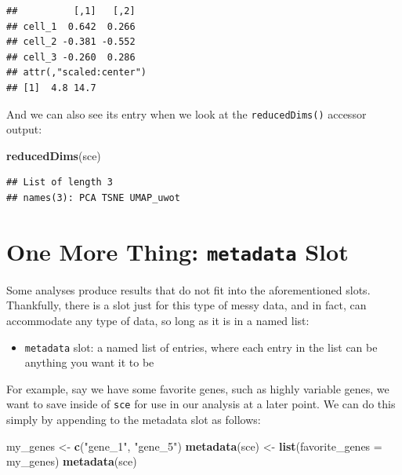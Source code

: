 \documentclass[]{book}
\newenvironment{Shaded}{\begin{snugshade}}{\end{snugshade}}
\newcommand{\DataTypeTok}[1]{\textcolor[rgb]{0.13,0.29,0.53}{#1}}
\newcommand{\KeywordTok}[1]{\textcolor[rgb]{0.13,0.29,0.53}{\textbf{#1}}}
\newcommand{\NormalTok}[1]{#1}
\newcommand{\StringTok}[1]{\textcolor[rgb]{0.31,0.60,0.02}{#1}}
\providecommand{\tightlist}{%
  \setlength{\itemsep}{0pt}\setlength{\parskip}{0pt}}
\begin{document}
\begin{verbatim}
##          [,1]   [,2]
## cell_1  0.642  0.266
## cell_2 -0.381 -0.552
## cell_3 -0.260  0.286
## attr(,"scaled:center")
## [1]  4.8 14.7
\end{verbatim}

And we can also see its entry when we look at the \texttt{reducedDims()} accessor output:

\begin{Shaded}
\begin{Highlighting}[]
\KeywordTok{reducedDims}\NormalTok{(sce)}
\end{Highlighting}
\end{Shaded}

\begin{verbatim}
## List of length 3
## names(3): PCA TSNE UMAP_uwot
\end{verbatim}

\hypertarget{one-more-thing-metadata-slot}{%
\section{\texorpdfstring{One More Thing: \texttt{metadata} Slot}{One More Thing: metadata Slot}}\label{one-more-thing-metadata-slot}}

Some analyses produce results that do not fit into the aforementioned slots. Thankfully, there is a slot just for this type of messy data, and in fact, can accommodate any type of data, so long as it is in a named list:

\begin{itemize}
\tightlist
\item
  \texttt{metadata} slot: a named list of entries, where each entry in the list can be anything you want it to be
\end{itemize}

For example, say we have some favorite genes, such as highly variable genes, we want to save inside of \texttt{sce} for use in our analysis at a later point. We can do this simply by appending to the metadata slot as follows:

\begin{Shaded}
\begin{Highlighting}[]
\NormalTok{my_genes <-}\StringTok{ }\KeywordTok{c}\NormalTok{(}\StringTok{"gene_1"}\NormalTok{, }\StringTok{"gene_5"}\NormalTok{)}
\KeywordTok{metadata}\NormalTok{(sce) <-}\StringTok{ }\KeywordTok{list}\NormalTok{(}\DataTypeTok{favorite_genes =}\NormalTok{ my_genes)}
\KeywordTok{metadata}\NormalTok{(sce)}
\end{Highlighting}
\end{Shaded}
\end{document}
